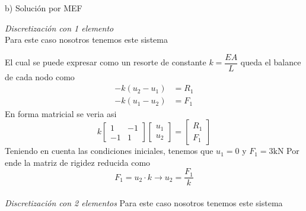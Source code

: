 \begin{desarrollo}{b) Soluci\'on por MEF}


    \textit{Discretizaci\'on con 1 elemento}\\
    
    Para este caso nosotros tenemos este sistema
 \begin{center}
\label{fig:malla1}
\end{center}
El cual se puede expresar como un resorte de constante $k=\dfrac{EA}{L}$
queda el balance de cada nodo como
\begin{align*}
    -k(u_2-u_1)&=R_1\\
    -k(u_1-u_2)&=F_1
\end{align*}
En forma matricial se veria asi
$$k\begin{bmatrix}
    1&-1\\
    -1&1
\end{bmatrix}\begin{bmatrix}
    u_1\\
    u_2
\end{bmatrix}=\begin{bmatrix}
    R_1\\
    F_1
\end{bmatrix}$$
Teniendo en cuenta las condiciones iniciales, tenemos que $u_1=0$ y $F_1=3\text{kN}$
Por ende la matriz de rigidez reducida como\\
$$F_1=u_2\cdot k\longrightarrow u_2=\dfrac{F_1}{k}$$
    \\
    \textit{Discretizaci\'on con 2 elementos}
    Para este caso nosotros tenemos este sistema
 \begin{center}
\end{center}
\end{desarrollo}
